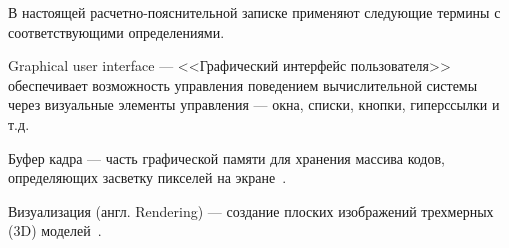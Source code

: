 
В настоящей расчетно-пояснительной записке применяют следующие термины с соответствующими определениями.\\

\begin{description}
	\item{Graphical user interface} --- <<Графический интерфейс пользователя>> обеспечивает возможность управления поведением вычислительной системы через визуальные элементы управления — окна, списки, кнопки, гиперссылки и т.д.~\cite{termin-cg}
 	\item{Буфер кадра} --- часть графической памяти для хранения массива кодов, определяющих засветку пикселей на экране~\cite{termin-cg}.
		\item{Визуализация (англ. Rendering)} --- создание плоских изображений трехмерных (3D) моделей~\cite{termin-cg}.
 	\end{description}
